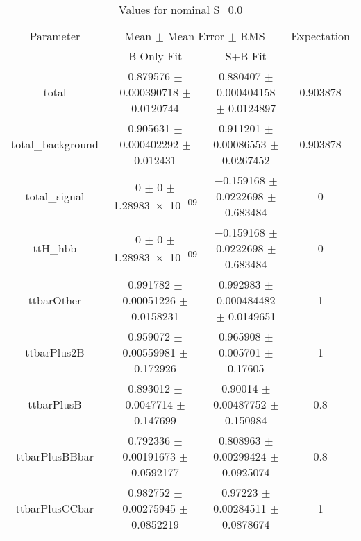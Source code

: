 \begin{table}
\centering
\caption{Values for nominal S=0.0}
\begin{tabular}{cccc}
\toprule
Parameter & \multicolumn{2}{c}{Mean $\pm$ Mean Error $\pm$ RMS} & Expectation\\
 & B-Only Fit & S+B Fit & \\
\midrule
total & \num{0.879576} $\pm$ \num{0.000390718} $\pm$ \num{0.0120744} & \num{0.880407} $\pm$ \num{0.000404158} $\pm$ \num{0.0124897} & \num{0.903878}\\
total\_background & \num{0.905631} $\pm$ \num{0.000402292} $\pm$ \num{0.012431} & \num{0.911201} $\pm$ \num{0.00086553} $\pm$ \num{0.0267452} & \num{0.903878}\\
total\_signal & \num{0} $\pm$ \num{0} $\pm$ \num{1.28983e-09} & \num{-0.159168} $\pm$ \num{0.0222698} $\pm$ \num{0.683484} & \num{0}\\
ttH\_hbb & \num{0} $\pm$ \num{0} $\pm$ \num{1.28983e-09} & \num{-0.159168} $\pm$ \num{0.0222698} $\pm$ \num{0.683484} & \num{0}\\
ttbarOther & \num{0.991782} $\pm$ \num{0.00051226} $\pm$ \num{0.0158231} & \num{0.992983} $\pm$ \num{0.000484482} $\pm$ \num{0.0149651} & \num{1}\\
ttbarPlus2B & \num{0.959072} $\pm$ \num{0.00559981} $\pm$ \num{0.172926} & \num{0.965908} $\pm$ \num{0.005701} $\pm$ \num{0.17605} & \num{1}\\
ttbarPlusB & \num{0.893012} $\pm$ \num{0.0047714} $\pm$ \num{0.147699} & \num{0.90014} $\pm$ \num{0.00487752} $\pm$ \num{0.150984} & \num{0.8}\\
ttbarPlusBBbar & \num{0.792336} $\pm$ \num{0.00191673} $\pm$ \num{0.0592177} & \num{0.808963} $\pm$ \num{0.00299424} $\pm$ \num{0.0925074} & \num{0.8}\\
ttbarPlusCCbar & \num{0.982752} $\pm$ \num{0.00275945} $\pm$ \num{0.0852219} & \num{0.97223} $\pm$ \num{0.00284511} $\pm$ \num{0.0878674} & \num{1}\\
\bottomrule
\end{tabular}
\end{table}